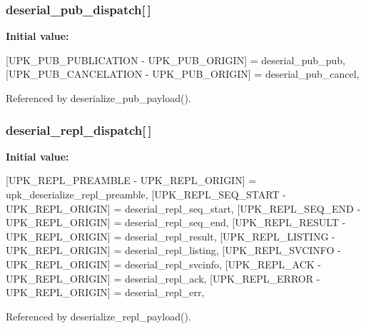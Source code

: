\subsubsection[{deserial\_\-pub\_\-dispatch}]{ {\bf deserial\_\-pub\_\-dispatch}[$\,$]\hspace{0.3cm}{\ttfamily  [static]}}\label{upk__v0__protocol__serializer_8c_a22052408dd487a48f772e043dcb9dac7}
{\bfseries Initial value:}
\begin{DoxyCode}
 {
    [UPK_PUB_PUBLICATION - UPK_PUB_ORIGIN] = deserial_pub_pub,
    [UPK_PUB_CANCELATION - UPK_PUB_ORIGIN] = deserial_pub_cancel,
}
\end{DoxyCode}


Referenced by deserialize\_\-pub\_\-payload().

\subsubsection[{deserial\_\-repl\_\-dispatch}]{ {\bf deserial\_\-repl\_\-dispatch}[$\,$]\hspace{0.3cm}{\ttfamily  [static]}}\label{upk__v0__protocol__serializer_8c_a835df861d1f4ad5654ede65cb3d41658}
{\bfseries Initial value:}
\begin{DoxyCode}
 {
    [UPK_REPL_PREAMBLE - UPK_REPL_ORIGIN] = upk_deserialize_repl_preamble,
    [UPK_REPL_SEQ_START - UPK_REPL_ORIGIN] = deserial_repl_seq_start,
    [UPK_REPL_SEQ_END - UPK_REPL_ORIGIN] = deserial_repl_seq_end,
    [UPK_REPL_RESULT - UPK_REPL_ORIGIN] = deserial_repl_result,
    [UPK_REPL_LISTING - UPK_REPL_ORIGIN] = deserial_repl_listing,
    [UPK_REPL_SVCINFO - UPK_REPL_ORIGIN] = deserial_repl_svcinfo,
    [UPK_REPL_ACK - UPK_REPL_ORIGIN] = deserial_repl_ack,
    [UPK_REPL_ERROR - UPK_REPL_ORIGIN] = deserial_repl_err,
}
\end{DoxyCode}


Referenced by deserialize\_\-repl\_\-payload().

